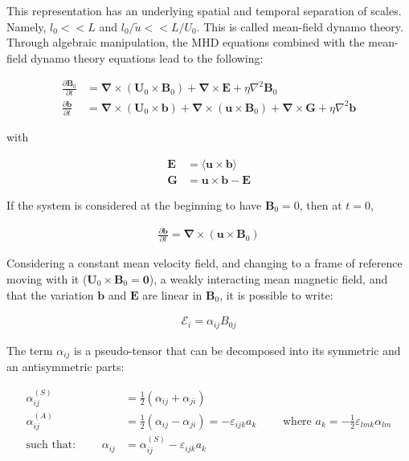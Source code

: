 \documentclass[a4paper,12pt]{article}
\begin{document}
This representation has an underlying spatial and temporal separation of scales. Namely, $l_0<<L$ and $l_0/\tilde{u} << L/U_0$. This is called mean-field dynamo theory. Through algebraic manipulation, the MHD equations combined with the mean-field dynamo theory equations lead to the following: 

\begin{align}
 \frac{\partial \bm B_0}{\partial t} &= \bm \nabla \times (\bm U_0 \times \bm B_0) + \bm \nabla \times \mathcal{\bm E} + \eta \nabla^2 \bm B_0 \\
 \frac{\partial \bm b}{\partial t} &= \bm \nabla \times (\bm U_0 \times \bm b) + \bm \nabla \times (\bm u \times \bm B_0) + \bm \nabla \times \bm G + \eta \nabla^2 \bm b
\end{align}

with 

\begin{align}
 \mathcal{\bm E} &= \langle \bm u \times \bm b \rangle \nonumber \\
 \bm G &= \bm u \times \bm b - \mathcal{\bm E} \nonumber
\end{align}

If the system is considered at the beginning to have $\bm B_0 = 0$, then at $t=0$,

\begin{align}
 \frac{\partial \bm b}{\partial t} = \bm \nabla \times (\bm u \times \bm B_0) \nonumber
\end{align}

Considering a constant mean velocity field, and changing to a frame of reference moving with it ($\bm U_0 \times \bm B_0 = \bm 0$), a weakly interacting mean magnetic field, and that the variation $\bm b$ and $\mathcal{\bm E}$ are linear in $\bm B_0$, it is possible to write:

\begin{align}
 \mathcal{E}_i = \alpha_{ij} B_{0j} \label{eq2.7}
\end{align}

The term $\alpha_{ij}$ is a pseudo-tensor that can be decomposed into its symmetric and an antisymmetric parts:

\begin{align}
 \alpha_{ij}^{(S)} &= \frac{1}{2} (\alpha_{ij} + \alpha_{ji}) \nonumber \\
 \alpha_{ij}^{(A)} &= \frac{1}{2} (\alpha_{ij} - \alpha_{ji}) = -\varepsilon_{ijk} a_k \qquad \text{ where } a_k = -\frac{1}{2} \varepsilon_{lmk}\alpha_{lm} \nonumber \\
 \text{such that: } \qquad \alpha_{ij} &= \alpha_{ij}^{(S)} - \varepsilon_{ijk}a_{k} \nonumber
\end{align}
\end{document}
